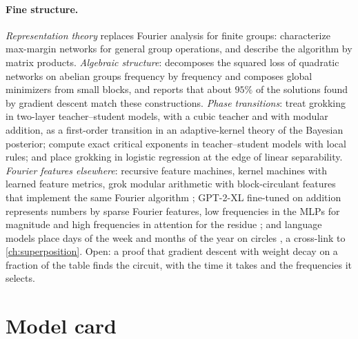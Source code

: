 \begin{refsection}
\paragraph{Fine structure.} \emph{Representation theory} replaces Fourier analysis for finite groups: \textcite{MorwaniEtAl2024} characterize max-margin networks for general group operations, and \textcite{ChughtaiEtAl2023} describe the algorithm by matrix products. \emph{Algebraic structure}: \textcite{Tian2025} decomposes the squared loss of quadratic networks on abelian groups frequency by frequency and composes global minimizers from small blocks, and reports that about $95\%$ of the solutions found by gradient descent match these constructions. \emph{Phase transitions}: \textcite{RubinEtAl2024} treat grokking in two-layer teacher--student models, with a cubic teacher and with modular addition, as a first-order transition in an adaptive-kernel theory of the Bayesian posterior; \textcite{ZunkovicIlievski2024} compute exact critical exponents in teacher--student models with local rules; and \textcite{BeckEtAl2025} place grokking in logistic regression at the edge of linear separability. \emph{Fourier features elsewhere}: recursive feature machines, kernel machines with learned feature metrics, grok modular arithmetic with block-circulant features that implement the same Fourier algorithm \parencite{MallinarEtAl2025}; GPT-2-XL fine-tuned on addition represents numbers by sparse Fourier features, low frequencies in the MLPs for magnitude and high frequencies in attention for the residue \parencite{ZhouEtAl2024}; and language models place days of the week and months of the year on circles \parencite{EngelsEtAl2025}, a cross-link to \cref{ch:superposition}. Open: a proof that gradient descent with weight decay on a fraction of the table finds the circuit, with the time it takes and the frequencies it selects.

\section{Model card}\label{sec:grokking:card}


\end{refsection}
